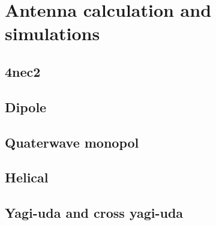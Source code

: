 \chapter{Antenna calculation and simulations}


\section{4nec2}
\section{Dipole}
\section{Quaterwave monopol}
\section{Helical}
\section{Yagi-uda and cross yagi-uda}
